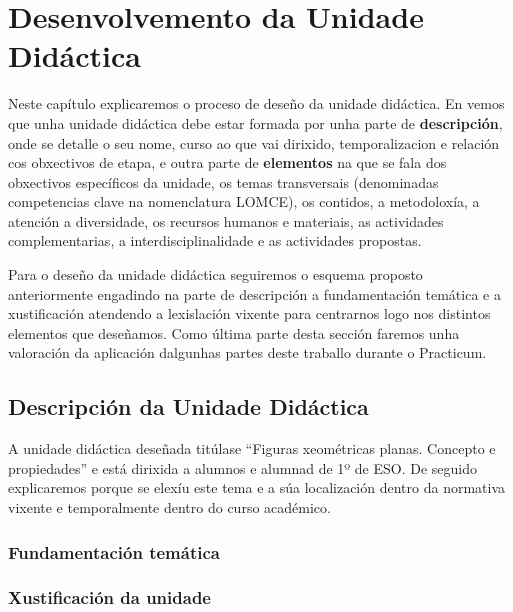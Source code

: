 \chapter{Desenvolvemento da Unidade Didáctica}\label{chap:desenvolvemento}
Neste capítulo explicaremos o proceso de deseño da unidade didáctica. En  vemos que unha unidade didáctica debe estar formada por unha parte de \textbf{descripción}, onde se detalle o seu nome, curso ao que vai dirixido, temporalizacion e relación cos obxectivos de etapa, e outra parte de \textbf{elementos} na que se fala dos obxectivos específicos da unidade, os temas transversais (denominadas competencias clave na nomenclatura LOMCE), os contidos, a metodoloxía, a atención a diversidade, os recursos humanos e materiais, as actividades complementarias, a interdisciplinalidade e as actividades propostas.

Para o deseño da unidade didáctica seguiremos o esquema proposto anteriormente engadindo na parte de descripción a fundamentación temática e a xustificación atendendo a lexislación vixente para centrarnos logo nos distintos elementos que deseñamos. Como última parte desta sección faremos unha valoración da aplicación dalgunhas partes deste traballo durante o Practicum.

\section{Descripción da Unidade Didáctica}
A unidade didáctica deseñada titúlase ``Figuras xeométricas planas. Concepto e propiedades'' e está dirixida a alumnos e alumnad de 1º de ESO. De seguido explicaremos porque se elexíu este tema e a súa localización dentro da normativa vixente e temporalmente dentro do curso académico.

\subsection{Fundamentación temática}

\subsection{Xustificación da unidade}

